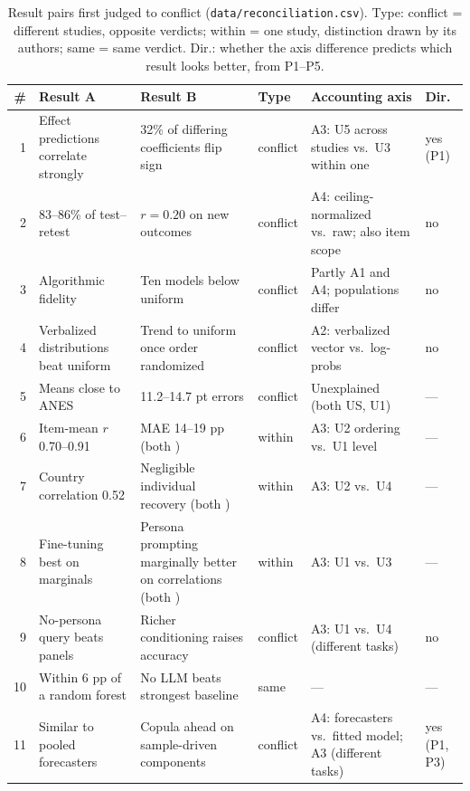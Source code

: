 \documentclass[11pt]{article}
\begin{document}
\begin{table}[!htbp]
\centering
\scriptsize
\caption{Result pairs first judged to conflict (\nolinkurl{data/reconciliation.csv}). Type: conflict = different studies, opposite verdicts; within = one study, distinction drawn by its authors; same = same verdict. Dir.: whether the axis difference predicts which result looks better, from P1--P5.}
\label{tab:reconcile}
\begin{tabular}{@{}rL{3.7cm}L{3.7cm}L{1.0cm}L{3.9cm}L{1.0cm}@{}}
\toprule
\# & Result A & Result B & Type & Accounting axis & Dir. \\
 & Effect predictions correlate strongly \citep{ashokkumar2026} & 32\% of differing coefficients flip sign \citep{bisbee2024} & conflict & A3: U5 across studies vs.\ U3 within one & yes (P1) \\
2 & 83--86\% of test--retest \citep{park2024} & $r=0.20$ on new outcomes \citep{peng2025funhouse} & conflict & A4: ceiling-normalized vs.\ raw; also item scope & no \\
3 & Algorithmic fidelity \citep{argyle2023} & Ten models below uniform \citep{hu2025simbench} & conflict & Partly A1 and A4; populations differ & no \\
4 & Verbalized distributions beat uniform \citep{meister2024} & Trend to uniform once order randomized \citep{dominguez2024} & conflict & A2: verbalized vector vs.\ log-probs & no \\
5 & Means close to ANES \citep{bisbee2024} & 11.2--14.7 pt errors \citep{pew2026} & conflict & Unexplained (both US, U1) & --- \\
6 & Item-mean $r$ 0.70--0.91 & MAE 14--19 pp (both \citealp{kim2026korean}) & within & A3: U2 ordering vs.\ U1 level & --- \\
7 & Country correlation 0.52 & Negligible individual recovery (both \citealp{wang2026ess}) & within & A3: U2 vs.\ U4 & --- \\
8 & Fine-tuning best on marginals & Persona prompting marginally better on correlations (both \citealp{williams2026beyond}) & within & A3: U1 vs.\ U3 & --- \\
9 & No-persona query beats panels \citep{doudkin2026} & Richer conditioning raises accuracy \citep{park2024} & conflict & A3: U1 vs.\ U4 (different tasks) & no \\
10 & Within 6 pp of a random forest \citep{ku2026} & No LLM beats strongest baseline \citep{chen2026synthetic} & same & --- & --- \\
11 & Similar to pooled forecasters \citep{ashokkumar2026} & Copula ahead on sample-driven components \citep{lukauskas2026} & conflict & A4: forecasters vs.\ fitted model; A3 (different tasks) & yes (P1, P3) \\

\end{tabular}
\end{table}
\end{document}
